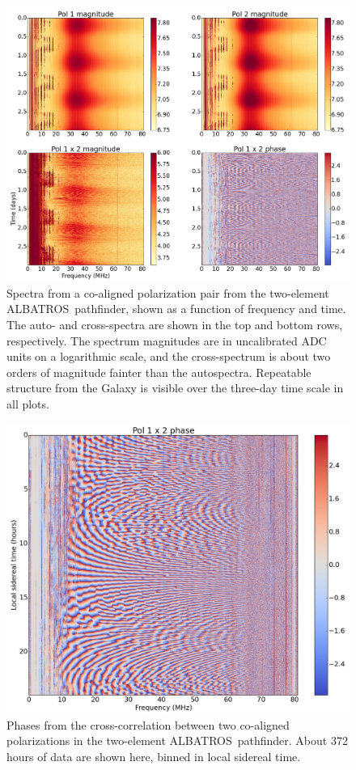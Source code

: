 \documentclass{ws-jai}
\def\albatros{ALBATROS}
\begin{document}
\begin{figure}[t]
  \begin{center}
    \includegraphics[width=0.9\linewidth]{Figures/albatros2_waterfalls.jpg}
    \caption{Spectra from a co-aligned polarization pair from the
      two-element \albatros\ pathfinder, shown as a function of
      frequency and time.  The auto- and cross-spectra are shown in
      the top and bottom rows, respectively.  The spectrum magnitudes
      are in uncalibrated ADC units on a logarithmic scale, and the
      cross-spectrum is about two orders of magnitude fainter than the
      autospectra.  Repeatable structure from the Galaxy is visible
      over the three-day time scale in all plots.}
    \label{Fig:albatros2_waterfalls}
  \end{center}
\end{figure}

\begin{figure}[t]
  \begin{center}
    \includegraphics[width=0.6\linewidth]{Figures/albatros2_lst_phase.jpg}
    \caption{Phases from the cross-correlation between two co-aligned
      polarizations in the two-element \albatros\ pathfinder.  About
      372 hours of data are shown here, binned in local sidereal
      time.}
    \label{Fig:albatros2_phase}
  \end{center}
\end{figure}
\end{document}
